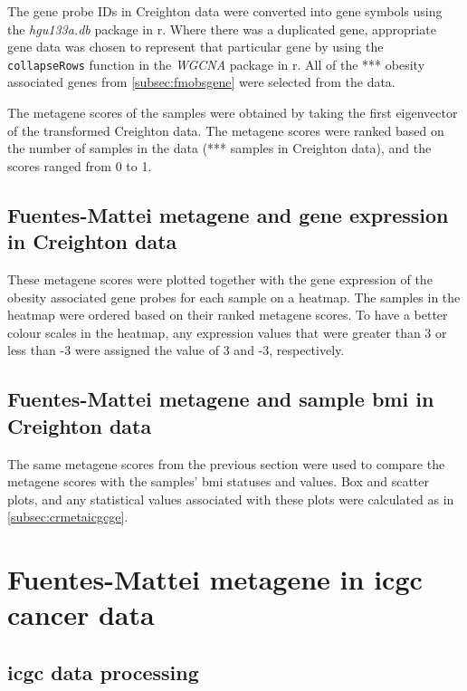 The gene probe IDs in Creighton data were converted into gene symbols using the \textit{hgu133a.db} package in \gls{r}.
Where there was a duplicated gene, appropriate gene data was chosen to represent that particular gene by using the \texttt{collapseRows} function in the \textit{WGCNA} package in \gls{r}.
All of the *** obesity associated genes from  \cref{subsec:fmobsgene} were selected from the data.

The \gls{metagene} scores of the samples were obtained by taking the first eigenvector of the transformed Creighton data.
The \gls{metagene} scores were ranked based on the number of samples in the data (*** samples in Creighton data), and the scores ranged from 0 to 1.

\subsection{Fuentes-Mattei metagene and gene expression in Creighton data}
\label{subsec:fmmetage}

These \gls{metagene} scores were plotted together with the gene expression of the obesity associated gene probes for each sample on a heatmap.
The samples in the heatmap were ordered based on their ranked \gls{metagene} scores.
To have a better colour scales in the heatmap, any expression values that were greater than 3 or less than -3 were assigned the value of 3 and -3, respectively.

\subsection{Fuentes-Mattei metagene and sample \gls{bmi} in Creighton data}
\label{subsec:fmmetabmi}

The same \gls{metagene} scores from the previous section were used to compare the \gls{metagene} scores with the samples' \gls{bmi} statuses and values.
Box and scatter plots, and any statistical values associated with these plots were calculated as in \cref{subsec:crmetaicgcge}.

\section{Fuentes-Mattei metagene in \gls{icgc} cancer data}
\label{sec:fmmetaicgc}

\subsection{\gls{icgc} data processing}
\label{subsec:datprocicgcfm}

